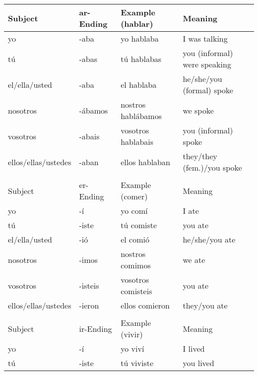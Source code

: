 \documentclass[a4paper,12pt]{article}
\begin{document}
\begin{table}[H]
\centering
\begin{tabular}{llll}
  Subject             & ar-Ending & Example (hablar)   & Meaning                      \\
  \toprule
  yo                  & -aba      & yo hablaba         & I was talking                \\
  tú                  & -abas     & tú hablabas        & you (informal) were speaking \\
  el/ella/usted       & -aba      & el hablaba         & he/she/you (formal) spoke    \\
  nosotros            & -ábamos   & nostros hablábamos & we spoke                     \\
  vosotros            & -abais    & vosotros hablabais & you (informal) spoke         \\
  ellos/ellas/ustedes & -aban     & ellos hablaban     & they/they (fem.)/you spoke   \\
  \midrule
                      &           &                    &                              \\
  Subject             & er-Ending & Example (comer)    & Meaning                      \\
  \toprule
  yo                  & -í        & yo comí            & I ate                        \\
  tú                  & -iste     & tú comiste         & you ate                      \\
  el/ella/usted       & -ió       & el comió           & he/she/you ate               \\
  nosotros            & -imos     & nostros comimos    & we ate                       \\
  vosotros            & -isteis   & vosotros comisteis & you ate                      \\
  ellos/ellas/ustedes & -ieron    & ellos comieron     & they/you ate                 \\
  \midrule
                      &           &                    &                              \\
  Subject             & ir-Ending & Example (vivir)    & Meaning                      \\
  \toprule
  yo                  & -í        & yo viví            & I lived                      \\
  tú                  & -iste     & tú viviste         & you lived                    \\

\end{tabular}
\end{table}
\end{document}
